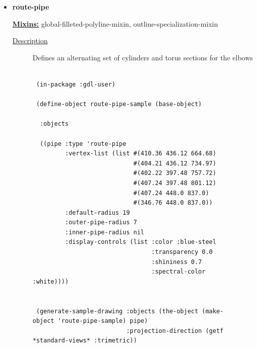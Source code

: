 \documentclass [11pt]{book}
\begin{document}
\begin{itemize}
\begin{description}
\end{description}







\item {}
\label{prim:route-pipe}
\textbf{route-pipe}


\textbf{
\underline{Mixins:}} global-filleted-polyline-mixin, outline-specialization-mixin





\begin{description}

\item [
\underline{Description}]


Defines an alternating set of cylinders and torus sections for the elbows



\end{description}




\begin{figure}
\begin{lrbox}{\boxedverb}
\begin{minipage}{\linewidth}
{\small

\begin{verbatim}

 (in-package :gdl-user)  

 (define-object route-pipe-sample (base-object)

  :objects

  ((pipe :type 'route-pipe
         :vertex-list (list #(410.36 436.12 664.68) 
                            #(404.21 436.12 734.97) 
                            #(402.22 397.48 757.72) 
                            #(407.24 397.48 801.12) 
                            #(407.24 448.0 837.0)
                            #(346.76 448.0 837.0))
         :default-radius 19
         :outer-pipe-radius 7
         :inner-pipe-radius nil
         :display-controls (list :color :blue-steel 
                                 :transparency 0.0 
                                 :shininess 0.7 
                                 :spectral-color :white))))

 
 (generate-sample-drawing :objects (the-object (make-object 'route-pipe-sample) pipe)
                          :projection-direction (getf *standard-views* :trimetric))
  



\end{verbatim}}
\end{minipage}
\end{lrbox}
\fbox{\usebox{\boxedverb}}


\end{figure}
\end{itemize}
\end{document}
